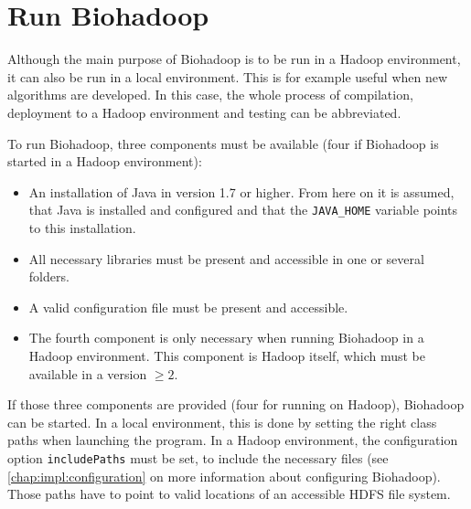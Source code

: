 %   
%   
  
\section{Run Biohadoop}
\label{chap:usage:run}
Although the main purpose of Biohadoop is to be run in a Hadoop environment, it can also be run in a local environment. This is for example useful when new algorithms are developed. In this case, the whole process of compilation, deployment to a Hadoop environment and testing can be abbreviated.

To run Biohadoop, three components must be available (four if Biohadoop is started in a Hadoop environment):

\begin{itemize}
  \item An installation of Java in version 1.7 or higher. From here on it is assumed, that Java is installed and configured and that the \texttt{JAVA\_HOME} variable points to this installation.
  \item All necessary libraries must be present and accessible in one or several folders.
  \item A valid configuration file must be present and accessible.
  \item The fourth component is only necessary when running Biohadoop in a Hadoop environment. This component is Hadoop itself, which must be available in a version $\geq 2$.
\end{itemize}

If those three components are provided (four for running on Hadoop), Biohadoop can be started. In a local environment, this is done by setting the right class paths when launching the program. In a Hadoop environment, the configuration option \texttt{includePaths} must be set, to include the necessary files (see \ref{chap:impl:configuration} on more information about configuring Biohadoop). Those paths have to point to valid locations of an accessible HDFS file system.

